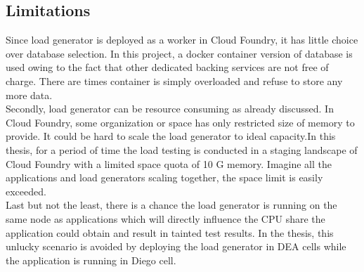 \subsection{Limitations}
Since load generator is deployed as a worker in Cloud Foundry, it has little choice over database selection. In this project, a docker container version of database is used owing to the fact that other dedicated backing services are not free of charge. There are times container is simply overloaded and refuse to store any more data. \\
Secondly, load generator can be resource consuming as already discussed. In Cloud Foundry, some organization or space has only restricted size of memory to provide. It could be hard to scale the load generator to ideal capacity.In this thesis, for a period of time the load testing is conducted in a staging landscape of Cloud Foundry with a limited space quota of 10 G memory. Imagine all the applications and load generators scaling together, the space limit is easily exceeded. \\
Last but not the least, there is a chance the load generator is running on the same node as applications which will directly influence the CPU share the application could obtain and result in tainted test results. In the thesis, this unlucky scenario is avoided by deploying the load generator in DEA cells while the application is running in Diego cell. 

